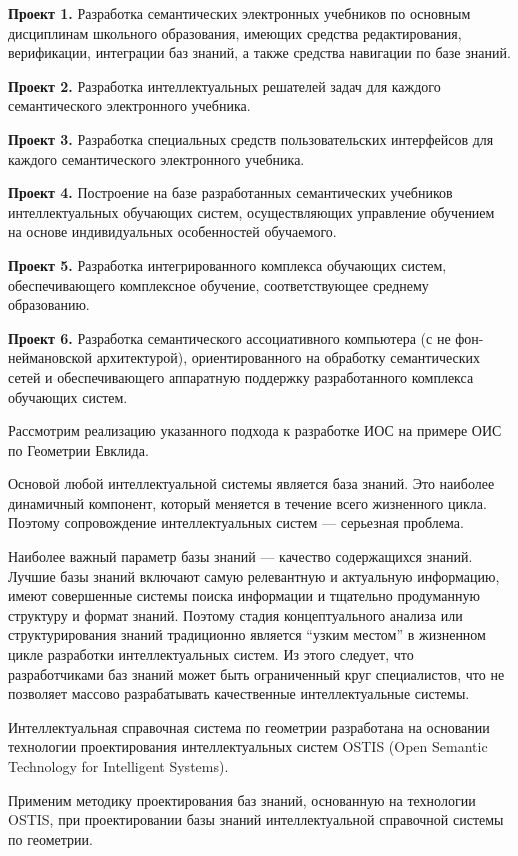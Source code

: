 \textbf{Проект 1.} Разработка семантических электронных учебников по основным дисциплинам школьного образования, имеющих средства редактирования, верификации, интеграции баз знаний, а также средства навигации по базе знаний.

\textbf{Проект 2.} Разработка интеллектуальных решателей задач для каждого семантического электронного учебника.

\textbf{Проект 3.} Разработка специальных средств пользовательских интерфейсов для каждого семантического электронного учебника.

\textbf{Проект 4.} Построение на базе разработанных семантических учебников интеллектуальных обучающих систем, осуществляющих управление обучением на основе индивидуальных особенностей обучаемого.

\textbf{Проект 5.} Разработка интегрированного комплекса обучающих систем, обеспечивающего комплексное обучение, соответствующее среднему образованию.

\textbf{Проект 6.} Разработка семантического ассоциативного компьютера (с не фон-неймановской архитектурой), ориентированного на обработку семантических сетей и обеспечивающего аппаратную поддержку разработанного комплекса обучающих систем.

Рассмотрим реализацию указанного подхода к разработке ИОС на примере ОИС по Геометрии Евклида.

Основой любой интеллектуальной системы является база знаний. Это наиболее динамичный компонент, который меняется в течение всего жизненного цикла. Поэтому сопровождение интеллектуальных систем --- серьезная проблема.

Наиболее важный параметр базы знаний --- качество содержащихся знаний. Лучшие базы знаний включают самую релевантную и актуальную информацию, имеют совершенные системы поиска информации и тщательно продуманную структуру и формат знаний. Поэтому стадия концептуального анализа или структурирования знаний традиционно является ``узким местом'' в жизненном цикле разработки интеллектуальных систем. Из этого следует, что разработчиками баз знаний может быть ограниченный круг специалистов, что не позволяет массово разрабатывать качественные интеллектуальные системы.

Интеллектуальная справочная система по геометрии разработана на основании технологии проектирования интеллектуальных систем OSTIS (Open Semantic Technology for Intelligent Systems).

Применим методику проектирования баз знаний, основанную на технологии OSTIS, при проектировании базы знаний интеллектуальной справочной системы по геометрии.

